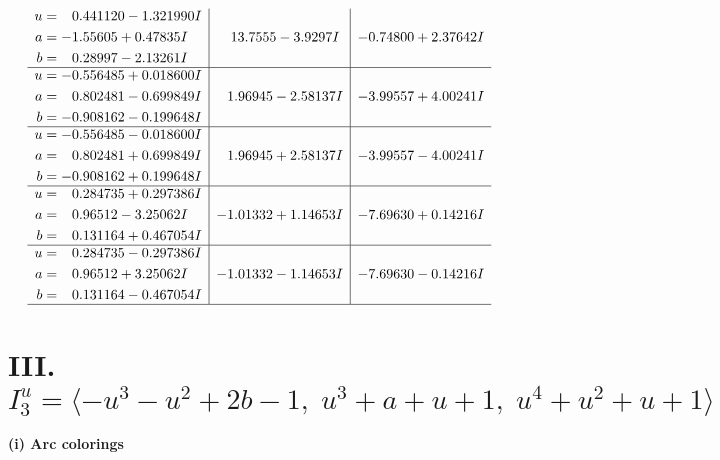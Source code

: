 \documentclass[1p]{elsarticle_modified}
\theoremstyle{definition}
\begin{document}
$$\begin{array}{c|c|c}
\begin{aligned}
u &= \phantom{-}0.441120 - 1.321990 I \\
a &= -1.55605 + 0.47835 I \\
b &= \phantom{-}0.28997 - 2.13261 I\end{aligned}
 & \phantom{-}13.7555 - 3.9297 I & -0.74800 + 2.37642 I \\ \hline\begin{aligned}
u &= -0.556485 + 0.018600 I \\
a &= \phantom{-}0.802481 - 0.699849 I \\
b &= -0.908162 - 0.199648 I\end{aligned}
 & \phantom{-}1.96945 - 2.58137 I & -3.99557 + 4.00241 I \\ \hline\begin{aligned}
u &= -0.556485 - 0.018600 I \\
a &= \phantom{-}0.802481 + 0.699849 I \\
b &= -0.908162 + 0.199648 I\end{aligned}
 & \phantom{-}1.96945 + 2.58137 I & -3.99557 - 4.00241 I \\ \hline\begin{aligned}
u &= \phantom{-}0.284735 + 0.297386 I \\
a &= \phantom{-}0.96512 - 3.25062 I \\
b &= \phantom{-}0.131164 + 0.467054 I\end{aligned}
 & -1.01332 + 1.14653 I & -7.69630 + 0.14216 I \\ \hline\begin{aligned}
u &= \phantom{-}0.284735 - 0.297386 I \\
a &= \phantom{-}0.96512 + 3.25062 I \\
b &= \phantom{-}0.131164 - 0.467054 I\end{aligned}
 & -1.01332 - 1.14653 I & -7.69630 - 0.14216 I\\
 \hline 
 \end{array}$$\newpage\newpage\renewcommand{\arraystretch}{1}
\centering \section*{III. $I^u_{3}= \langle - u^3- u^2+2 b-1,\;u^3+a+u+1,\;u^4+u^2+u+1 \rangle$}
\flushleft \textbf{(i) Arc colorings}\\
\end{document}
